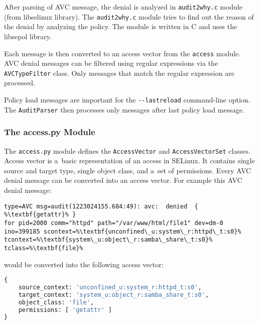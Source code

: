 After parsing of AVC message, the denial is analyzed in \texttt{audit2why.c}
module (from libselinux library). The \texttt{audit2why.c} module tries to find
out the reason of the denial by analyzing the policy. The module is written in C
and uses the libsepol library.

Each message is then converted to an access vector from the \texttt{access}
module. AVC denial messages can be filtered using regular expressions via the
\texttt{AVCTypeFilter} class. Only messages that match the regular expression
are processed.

Policy load messages are important for the \texttt{-{}-lastreload} command-line
option. The \texttt{AuditParser} then processes only messages after last policy
load message.

\subsubsection{The access.py Module}

The \texttt{access.py} module defines the \texttt{AccessVector} and
\texttt{AccessVectorSet} classes. Access vector is a~basic representation of an
access in SELinux. It contains single source and target type, single object
class, and a~set of permissions. Every AVC denial message can be converted into
an access vector. For example this AVC denial message:
\begin{lstlisting}[escapechar=\%]
type=AVC msg=audit(1223024155.684:49): avc:  denied  { %\textbf{getattr}% }
for pid=2000 comm="httpd" path="/var/www/html/file1" dev=dm-0
ino=399185 scontext=%\textbf{unconfined\_u:system\_r:httpd\_t:s0}%
tcontext=%\textbf{system\_u:object\_r:samba\_share\_t:s0}% tclass=%\textbf{file}%
\end{lstlisting}
would be converted into the following access vector:
\begin{lstlisting}[language=Python]
{
    source_context: 'unconfined_u:system_r:httpd_t:s0',
    target_context: 'system_u:object_r:samba_share_t:s0',
    object_class: 'file',
    permissions: [ 'getattr' ]
}
\end{lstlisting}

